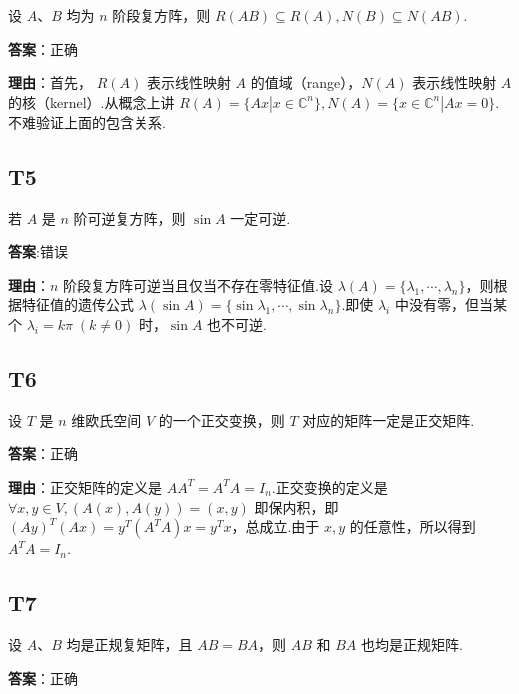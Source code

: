\documentclass{article}
\begin{document}
\par 设 $A、B$ 均为 $n$ 阶段复方阵，则 $R(AB)\subseteq R(A), N(B)\subseteq N(AB)$.

\par \textbf{答案}：正确

\par \textbf{理由}：首先， $R(A)$ 表示线性映射 $A$ 的值域（range），$N(A)$ 表示线性映射 $A$ 的核（kernel）.从概念上讲 $R(A)=\{Ax | x\in \mathbb C^n\}, N(A)=\{x\in \mathbb C^n|Ax=0\}$.不难验证上面的包含关系.

\subsection{T5}

\par 若 $A$ 是 $n$ 阶可逆复方阵，则 $\sin A$ 一定可逆.

\par \textbf{答案}:错误

\par \textbf{理由}：$n$ 阶段复方阵可逆当且仅当不存在零特征值.设 $\lambda(A)=\{\lambda_1, \cdots, \lambda_n\}$，则根据特征值的遗传公式 $\lambda(\sin A)=\{\sin \lambda_1, \cdots, \sin \lambda_n\}$.即使 $\lambda_i$ 中没有零，但当某个 $\lambda_i=k\pi\;(k\neq 0)$ 时，$\sin A$ 也不可逆.

\subsection{T6}

\par 设 $T$ 是 $n$ 维欧氏空间 $V$ 的一个正交变换，则 $T$ 对应的矩阵一定是正交矩阵.

\par \textbf{答案}：正确

\par \textbf{理由}：正交矩阵的定义是 $AA^T=A^TA=I_n$.正交变换的定义是 $\forall x, y\in V, (A(x), A(y))=(x, y)$ 即保内积，即 $(Ay)^T(Ax)=y^T(A^TA)x=y^Tx$，总成立.由于 $x, y$ 的任意性，所以得到 $A^TA=I_n$.

\subsection{T7}

\par 设 $A、B$ 均是正规复矩阵，且 $AB=BA$，则 $AB$ 和 $BA$ 也均是正规矩阵.

\par \textbf{答案}：正确
\end{document}
